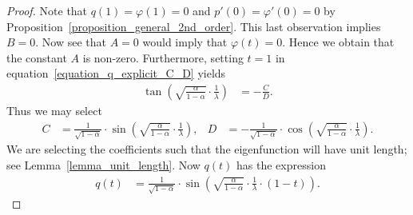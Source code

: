 \documentclass[11pt,reqno]{amsart}
\theoremstyle{definition}
\numberwithin{equation}{section}
\begin{document}
\begin{proof}
Note that $q(1) = \varphi(1) = 0$
and $p'(0) = \varphi'(0) = 0$
by
Proposition~\ref{proposition_general_2nd_order}.
This last observation implies $B=0$.
Now see that $A = 0$
would imply that $\varphi(t) = 0$.
Hence we obtain that the constant $A$ is non-zero.
Furthermore, setting $t=1$ in
equation~\eqref{equation_q_explicit_C_D}
yields
\begin{align*}
\tan\left( \sqrt{\frac{\alpha}{1-\alpha}} \cdot \frac{1}{\lambda} \right)
& =
- \frac{C}{D} .
\end{align*}
Thus we may select
\begin{align*}
C
& =
\frac{1}{\sqrt{1-\alpha}}
\cdot
\sin\left( \sqrt{\frac{\alpha}{1-\alpha}} \cdot \frac{1}{\lambda} \right),
&
D
& =
- \frac{1}{\sqrt{1-\alpha}}
\cdot
\cos\left( \sqrt{\frac{\alpha}{1-\alpha}} \cdot \frac{1}{\lambda} \right) .
\end{align*}
We are selecting the coefficients such that the eigenfunction will have
unit length; see Lemma~\ref{lemma_unit_length}.
Now $q(t)$ has the expression
\begin{align}
q(t)
& =
\frac{1}{\sqrt{1-\alpha}}
\cdot
\sin\left( \sqrt{\frac{\alpha}{1-\alpha}} \cdot \frac{1}{\lambda} \cdot (1-t) \right) .
\label{equation_q_explicit_again}
\end{align}



\end{proof}
\end{document}
